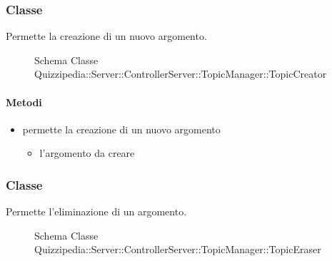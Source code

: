 \subsubsection{Classe }
Permette la creazione di un nuovo argomento.
\begin{figure}[H]
\centering
\noindent{}
\caption[Schema Classe TopicCreator]{Schema Classe Quizzipedia::Server::ControllerServer::TopicManager::TopicCreator}
\end{figure}
\paragraph{Metodi}
\begin{itemize}
\item {}
\newline
permette la creazione di un nuovo argomento
\newline
{}
\newline
\begin{itemize}
\item {}
\newline
l'argomento da creare
\end{itemize}
\end{itemize}
\subsubsection{Classe }
Permette l'eliminazione di un argomento.
\begin{figure}[H]
\centering
\noindent{}
\caption[Schema Classe TopicEraser]{Schema Classe Quizzipedia::Server::ControllerServer::TopicManager::TopicEraser}
\end{figure}
